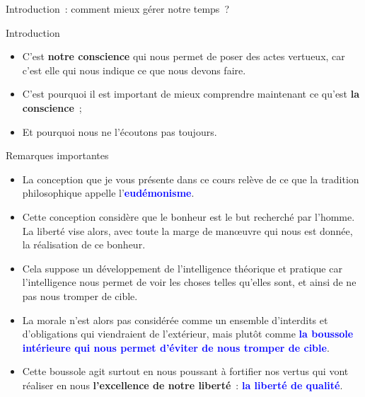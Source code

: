 \documentclass[11pt,xcolor=dvipsname,ignorenonframetext,handout]{beamer}
\begin{document}
\begin{frame}{Introduction~: comment mieux gérer notre temps~?}
\begin{frame}{Introduction}
    \begin{itemize}
        \rightskip=0pt\leftskip=0pt
        \item C'est \textbf{notre conscience} qui nous permet de poser des actes vertueux, car c'est elle qui nous indique ce que nous devons faire.
        \item C'est pourquoi il est important de mieux comprendre maintenant ce qu'est \textbf{la conscience}~;
        \item Et pourquoi nous ne l'écoutons pas toujours.
    \end{itemize}
\end{frame}
\begin{frame}{Remarques importantes}
    \begin{itemize}
    \rightskip=0pt\leftskip=0pt    
    \item La conception que je vous présente dans ce cours relève de ce que la tradition philosophique appelle l'\textcolor{blue}{\textbf{eudémonisme}}.
    \item Cette conception considère que le bonheur est le but recherché par l'homme. La liberté vise alors, avec toute la marge de manœuvre qui nous est donnée, la réalisation de ce bonheur. 
    \item Cela suppose un développement de l'intelligence théorique et pratique car l'intelligence nous permet de voir les choses telles qu'elles sont, et ainsi de ne pas nous tromper de cible. 
    \item La morale n'est alors pas considérée comme un ensemble d'interdits et d'obligations qui viendraient de l'extérieur, mais plutôt comme \textcolor{blue}{\textbf{la boussole intérieure qui nous permet d'éviter de nous tromper de cible}}.
    \item Cette boussole agit surtout en nous poussant à fortifier nos vertus qui vont réaliser en nous \textbf{l'excellence de notre liberté}~: \textcolor{blue}{\textbf{la liberté de qualité}}.
    \end{itemize}
\end{frame}

\end{frame}
\end{document}
